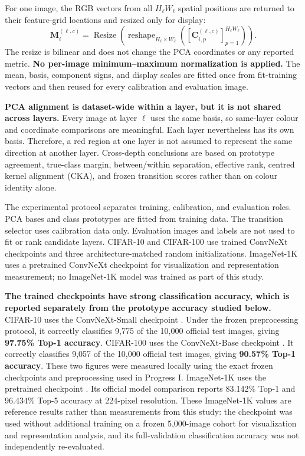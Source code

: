 For one image, the RGB vectors from all $H_\ell W_\ell$ spatial positions are
returned to their feature-grid locations and resized only for display:
\begin{equation}
    \bm M_i^{(\ell,c)}
    =
    \operatorname{Resize}
    \left(
        \operatorname{reshape}_{H_\ell\times W_\ell}
        \left(
            \left[\bm C^{(\ell,c)}_{i,p}\right]_
            {p=1}^{H_\ell W_\ell}
        \right)
    \right).
    \label{eq:pca-rgb-image}
\end{equation}
The resize is bilinear and does not change the PCA coordinates or any reported
metric. \textbf{No per-image minimum--maximum normalization is applied.} The mean,
basis, component signs, and display scales are fitted once from fit-training
vectors and then reused for every calibration and evaluation image.

\textbf{PCA alignment is dataset-wide within a layer, but it is not shared
across layers.} Every image at layer $\ell$ uses the same basis, so same-layer
colour and coordinate comparisons are meaningful. Each layer nevertheless has
its own basis. Therefore, a red region at one layer is not assumed to represent
the same direction at another layer. Cross-depth conclusions are based on
prototype agreement, true-class margin, between/within separation, effective
rank, centred kernel alignment (CKA), and frozen transition scores rather than
on colour identity alone.

The experimental protocol separates training, calibration, and evaluation
roles. PCA bases and class prototypes are fitted from training data. The
transition selector uses calibration data only. Evaluation images and labels
are not used to fit or rank candidate layers. CIFAR-10 and CIFAR-100 use trained
ConvNeXt checkpoints and three architecture-matched random initializations.
ImageNet-1K uses a pretrained ConvNeXt checkpoint for visualization and
representation measurement; no ImageNet-1K model was trained as part of this
study.

\textbf{The trained checkpoints have strong classification accuracy, which is
reported separately from the prototype accuracy studied below.} CIFAR-10 uses
the ConvNeXt-Small checkpoint
 \cite{clr4takeoff2026convnextcifar10}.
Under the frozen preprocessing protocol, it correctly classifies 9,775 of the
10,000 official test images, giving \textbf{97.75\% Top-1 accuracy}. CIFAR-100
uses the ConvNeXt-Base checkpoint
\cite{anonauthors2026convnextcifar100}. It correctly classifies 9,057 of the
10,000 official test images, giving \textbf{90.57\% Top-1 accuracy}. These two
figures were measured locally using the exact frozen checkpoints and
preprocessing used in Progress I. ImageNet-1K uses the pretrained
 checkpoint
\cite{wightman2026convnextsmallfbin1k}. Its official model comparison reports
83.142\% Top-1 and 96.434\% Top-5 accuracy at 224-pixel resolution. These
ImageNet-1K values are reference results rather than measurements from this
study: the checkpoint was used without additional training on a frozen
5,000-image cohort for visualization and representation analysis, and its
full-validation classification accuracy was not independently re-evaluated.

